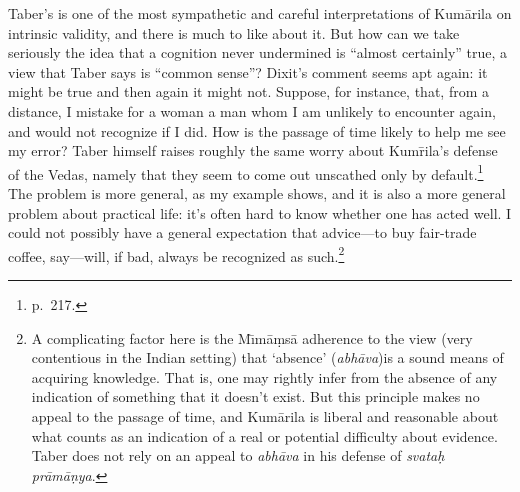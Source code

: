 ﻿\documentclass[11pt]{amsart}
\begin{document}
Taber's is one of the most sympathetic and careful interpretations of Kum\=arila on intrinsic validity, and there is much to like about it. But how can we take seriously the idea that a cognition never undermined is ``almost certainly'' true, a view that Taber says is ``common sense''? Dixit's comment seems apt again: it might be true and then again it might not. Suppose, for instance, that, from a distance, I mistake for a woman a man whom I am unlikely to encounter again, and would not recognize if I did. How is the passage of time likely to help me see my error? Taber himself raises roughly the same worry about Kum\=rila's defense of the Vedas, namely that they seem to come out unscathed only by default.\footnote{p.~217.} The problem is more general, as my example shows, and it is also a more general problem about practical life: it's often hard to know whether one has acted well. I could not possibly have a general expectation that advice---to buy fair-trade coffee, say---will, if bad, always be recognized as such.\footnote{A complicating factor here is the M\={\i}m\=a\d ms\=a adherence to the view (very contentious in the Indian setting) that `absence' (\emph{abh\=ava})is a sound means of acquiring knowledge. That is, one may rightly infer from the absence of any indication of something that it doesn't exist. But this principle makes no appeal to the passage of time, and Kum\=arila is liberal and reasonable about what counts as an indication of a real or potential difficulty about evidence. Taber does not rely on an appeal to \emph{abh\=ava} in his defense of \emph{svata\d h pr\=am\=a\d nya}.}

\end{document}

